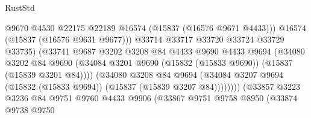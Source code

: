 \begin{lexlean}{RustStd}
\begin{coremodule}
{\begin{coremodule}
{{{{{{{{{{{{{{{{{{{{{{{{{{{{{{{{{{{{{{{{{{{{{{{{{{{{{{{{{{{{                                          @9670
                                          @4530
                                          @22175
                                          @22189
                                          @16574
                                          (@15837 (@16576 @9671 @4433)))
                                        @16574
                                        (@15837 (@16576 @9631 @9677)))
                                      @33714
                                      @33717
                                      @33720
                                      @33724
                                      @33729
                                      @33735)
                                    (@33741
                                      @9687
                                      @3202
                                      @3208
                                      @84
                                      @4433
                                      @9690
                                      @4433
                                      @9694
                                      (@34080
                                        @3202
                                        @84
                                        @9690
                                        (@34084
                                          @3201
                                          @9690
                                          (@15832 (@15833 @9690))
                                          (@15837 (@15839 @3201 @84))))
                                      (@34080
                                        @3208
                                        @84
                                        @9694
                                        (@34084
                                          @3207
                                          @9694
                                          (@15832 (@15833 @9694))
                                          (@15837 (@15839 @3207 @84))))))))
                              (@33857
                                @3223
                                @3236
                                @84
                                @9751
                                @9760
                                @4433
                                @9906
                                (@33867
                                  @9751
                                  @9758
                                  @8950
                                  (@33874
                                    @9738
                                    @9750
}}}}}}}}}}}}}}}}}}}}}}}}}}}}}}}}}}}}}}}}}}}}}}}}}}}}}}}}}}}}
\end{coremodule}}
\end{coremodule}
\end{lexlean}
